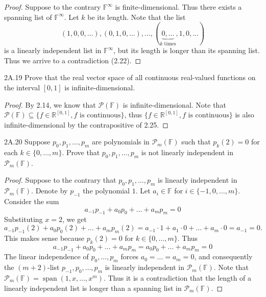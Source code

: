 \documentclass{exam}
\DeclareMathOperator{\spn}{span}
\begin{document}
\begin{proof}
    Suppose to the contrary $\mathbb F^{\infty}$ is finite-dimensional. Thus there exists a spanning list of $\mathbb F^{\infty}$. Let $k$ be its length. Note that the list $$(1, 0, 0, \dots), (0, 1, 0, \dots), \dots, (\underbrace{0, \dots}_{k\text{ times}}, 1, 0, \dots)$$ is a linearly independent list in $\mathbb F^\infty$, but its length is longer than its spanning list. Thus we arrive to a contradiction (2.22).
\end{proof}

\begin{problem}{2A.19}
    Prove that the real vector space of all continuous real-valued functions on the interval $[0, 1]$ is infinite-dimensional.
\end{problem}

\begin{proof}
    By 2.14, we know that $\mathcal P(\mathbb F)$ is infinite-dimensional. Note that $\mathcal P(\mathbb F)\subseteq 
    \{f\in\mathbb R^{[0, 1]}, f\text{ is continuous}\}$, thus $\{f\in\mathbb R^{[0, 1]}, f\text{ is continuous}\}$ is also infinite-dimensional by the contrapositive of 2.25.
\end{proof}

\begin{problem}{2A.20}
    Suppose $p_0, p_1, \dots, p_m$ are polynomials in $\mathcal P_m(\mathbb F)$ such that $p_k(2) = 0$ for each $k\in\{0, \dots, m\}$. Prove that $p_0, p_1, \dots, p_m$ is not linearly independent in $\mathcal P_m(\mathbb F)$.
\end{problem}

\begin{proof}
    Suppose to the contrary that $p_0, p_1, \dots, p_m$ is linearly independent in $\mathcal P_m(\mathbb F)$. Denote by $p_{-1}$ the polynomial $1$. Let $a_i\in\mathbb F$ for $i\in\{-1, 0,\dots, m\}$. Consider the sum \[
        a_{-1}p_{-1} + a_0p_0 + \dots + a_mp_m = 0
    \]
    Substituting $x = 2$, we get \[
        a_{-1}p_{-1}(2) + a_0p_0(2) + \dots + a_mp_m(2) = a_{-1}\cdot1 + a_1\cdot 0 + \dots + a_m\cdot0 = a_{-1} = 0.
    \]
    This makes sense because $p_k(2) = 0$ for $k\in\{0, \dots, m\}$. Thus \[
        a_{-1}p_{-1} + a_0p_0 + \dots + a_mp_m = a_0p_0 + \dots + a_mp_m = 0
    \]
    The linear independence of $p_0, \dots, p_m$ forces $a_0 = \dots = a_m = 0$, and consequently the $(m+2)$-list $p_{-1}, p_0, \dots, p_m$ is linearly independent in $\mathcal P_m(\mathbb F)$. Note that $\mathcal P_m(\mathbb F) = \spn(1, x, \dots, x^m)$. Thus it is a contradiction that the length of a linearly independent list is longer than a spanning list in $\mathcal P_m(\mathbb F)$.
\end{proof}
\end{document}
